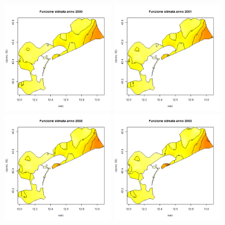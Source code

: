 \documentclass[a4paper,11pt,twoside,openright]{book}							%
\begin{document}
\begin{figure}[H]
	\includegraphics[width=0.43\textwidth ,height=0.235\textheight]{Immagini/venezia_con_covariate/Anno2000.png}
	\includegraphics[width=0.43\textwidth ,height=0.235\textheight]{Immagini/venezia_con_covariate/Anno2001.png}
	\includegraphics[width=0.43\textwidth ,height=0.235\textheight]{Immagini/venezia_con_covariate/Anno2002.png}
	\includegraphics[width=0.43\textwidth ,height=0.235\textheight]{Immagini/venezia_con_covariate/Anno2003.png}

\end{figure}
\end{document}
